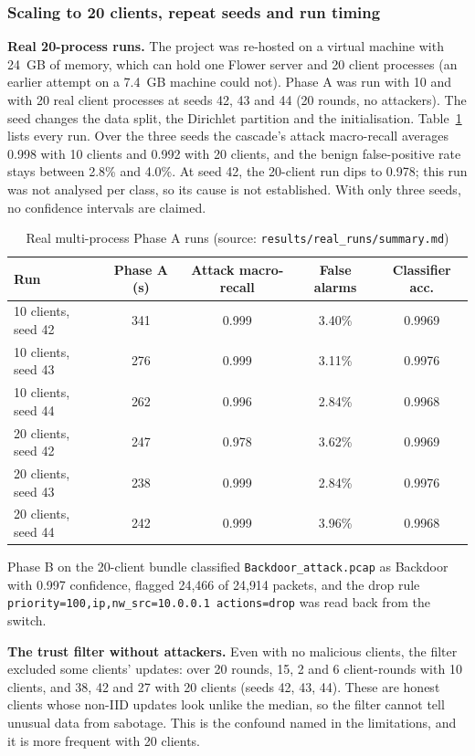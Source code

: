 \subsubsection{Scaling to 20 clients, repeat seeds and run timing}
\textbf{Real 20-process runs.} The project was re-hosted on a virtual machine with 24~GB of memory, which can hold one Flower server and 20 client processes (an earlier attempt on a 7.4~GB machine could not). Phase A was run with 10 and with 20 real client processes at seeds 42, 43 and 44 (20 rounds, no attackers). The seed changes the data split, the Dirichlet partition and the initialisation. Table~\ref{tab:realruns} lists every run. Over the three seeds the cascade's attack macro-recall averages 0.998 with 10 clients and 0.992 with 20 clients, and the benign false-positive rate stays between 2.8\% and 4.0\%. At seed 42, the 20-client run dips to 0.978; this run was not analysed per class, so its cause is not established. With only three seeds, no confidence intervals are claimed.

\begin{table}[H]
\centering
\renewcommand{\arraystretch}{1.2}
\begin{tabular}{|l|c|c|c|c|}
\hline
\textbf{Run} & \textbf{Phase A (s)} & \textbf{Attack macro-recall} & \textbf{False alarms} & \textbf{Classifier acc.} \\ \hline
10 clients, seed 42 & 341 & 0.999 & 3.40\% & 0.9969 \\ \hline
10 clients, seed 43 & 276 & 0.999 & 3.11\% & 0.9976 \\ \hline
10 clients, seed 44 & 262 & 0.996 & 2.84\% & 0.9968 \\ \hline
20 clients, seed 42 & 247 & 0.978 & 3.62\% & 0.9969 \\ \hline
20 clients, seed 43 & 238 & 0.999 & 2.84\% & 0.9976 \\ \hline
20 clients, seed 44 & 242 & 0.999 & 3.96\% & 0.9968 \\ \hline
\end{tabular}
\caption{Real multi-process Phase A runs (source: \texttt{results/real\_runs/summary.md})}
\label{tab:realruns}
\end{table}

Phase B on the 20-client bundle classified \texttt{Backdoor\_attack.pcap} as Backdoor with 0.997 confidence, flagged 24{,}466 of 24{,}914 packets, and the drop rule \texttt{priority=100,ip,nw\_src=10.0.0.1 actions=drop} was read back from the switch.

\textbf{The trust filter without attackers.} Even with no malicious clients, the filter excluded some clients' updates: over 20 rounds, 15, 2 and 6 client-rounds with 10 clients, and 38, 42 and 27 with 20 clients (seeds 42, 43, 44). These are honest clients whose non-IID updates look unlike the median, so the filter cannot tell unusual data from sabotage. This is the confound named in the limitations, and it is more frequent with 20 clients.

